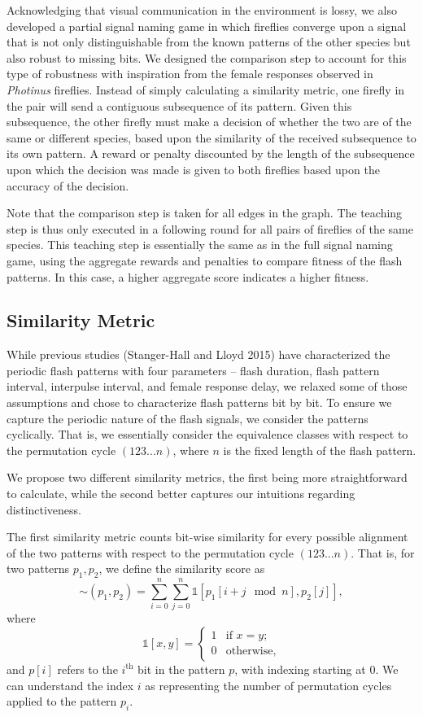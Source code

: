 Acknowledging that visual communication in the environment is lossy, we also developed a partial signal naming game in which fireflies converge upon a signal that is not only distinguishable from the known patterns of the other species but also robust to missing bits. 
We designed the comparison step to account for this type of robustness with inspiration from the female responses observed in {\it Photinus} fireflies. 
Instead of simply calculating a similarity metric, one firefly in the pair will send a contiguous subsequence of its pattern. Given this subsequence, the other firefly must make a decision of whether the two are of the same or different species, based upon the similarity of the received subsequence to its own pattern. 
A reward or penalty discounted by the length of the subsequence upon which the decision was made is given to both fireflies based upon the accuracy of the decision. 

Note that the comparison step is taken for all edges in the graph. The teaching step is thus only executed in a following round for all pairs of fireflies of the same species. 
This teaching step is essentially the same as in the full signal naming game, using the aggregate rewards and penalties to compare fitness of the flash patterns. 
In this case, a higher aggregate score indicates a higher fitness. 


\subsection{Similarity Metric}
While previous studies (Stanger-Hall and Lloyd 2015) have characterized the periodic flash patterns with four parameters -- flash duration, flash pattern interval, interpulse interval, and female response delay, we relaxed some of those assumptions and chose to characterize flash patterns bit by bit. 
To ensure we capture the periodic nature of the flash signals, we consider the patterns cyclically. That is, we essentially consider the equivalence classes with respect to the permutation cycle $(1 2 3 ... n)$, where $n$ is the fixed length of the flash pattern. 

We propose two different similarity metrics, the first being more straightforward to calculate, while the second better captures our intuitions regarding distinctiveness. 

The first similarity metric counts bit-wise similarity for every possible alignment of the two patterns with respect to the permutation cycle $(1 2 3 ... n)$. That is, for two patterns $p_1, p_2$, we define the similarity score as
\[ \sim (p_1, p_2) = \sum_{i=0}^n \sum_{j=0}^n \mathbb1 \left[p_1 [i+j \mod n], p_2[j] \right] ,\]
where 
\[ \mathbb1 [x,y] = \begin{cases} 1 &\textrm{if } x = y ; \\ 0 &\textrm{otherwise,} \end{cases} \] 
and 
$p[i]$ refers to the $i^{\textrm{th}}$ bit in the pattern $p$, with indexing starting at 0.
We can understand the index $i$ as representing the number of permutation cycles applied to the pattern $p_i$. 

